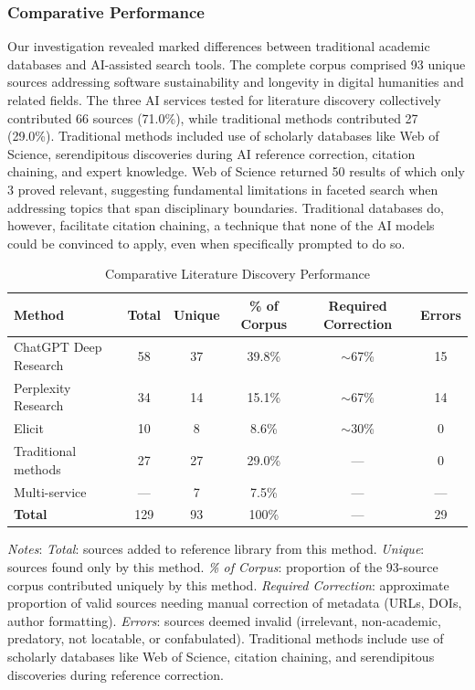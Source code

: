 \subsubsection{Comparative Performance}

Our investigation revealed marked differences between traditional academic databases and AI-assisted search tools. The complete corpus comprised 93 unique sources addressing software sustainability and longevity in digital humanities and related fields. The three AI services tested for literature discovery collectively contributed 66 sources (71.0\%), while traditional methods contributed 27 (29.0\%). Traditional methods included use of scholarly databases like Web of Science, serendipitous discoveries during AI reference correction, citation chaining, and expert knowledge. Web of Science returned 50 results of which only 3 proved relevant, suggesting fundamental limitations in faceted search when addressing topics that span disciplinary boundaries. Traditional databases do, however, facilitate citation chaining, a technique that none of the AI models could be convinced to apply, even when specifically prompted to do so. 

\begin{table}[h]
\centering
\caption{Comparative Literature Discovery Performance}
\label{tab:literature-performance}
\begin{tabular}{lccccc}
\toprule
\textbf{Method} & \textbf{Total} & \textbf{Unique} & \textbf{\% of Corpus} & \textbf{Required Correction} & \textbf{Errors} \\
\midrule
ChatGPT Deep Research & 58 & 37 & 39.8\% & $\sim$67\% & 15 \\
Perplexity Research & 34 & 14 & 15.1\% & $\sim$67\% & 14 \\
Elicit & 10 & 8 & 8.6\% & $\sim$30\% & 0 \\
Traditional methods & 27 & 27 & 29.0\% & --- & 0 \\
Multi-service & --- & 7 & 7.5\% & --- & --- \\
\midrule
\textbf{Total} & 129 & 93 & 100\% & --- & 29 \\
\bottomrule
\end{tabular}
\smallskip
{\small \textit{Notes}: \textit{Total}: sources added to reference library from this method. \textit{Unique}: sources found only by this method. \textit{\% of Corpus}: proportion of the 93-source corpus contributed uniquely by this method. \textit{Required Correction}: approximate proportion of valid sources needing manual correction of metadata (URLs, DOIs, author formatting). \textit{Errors}: sources deemed invalid (irrelevant, non-academic, predatory, not locatable, or confabulated). Traditional methods include use of scholarly databases like Web of Science, citation chaining, and serendipitous discoveries during reference correction.}
\end{table}

